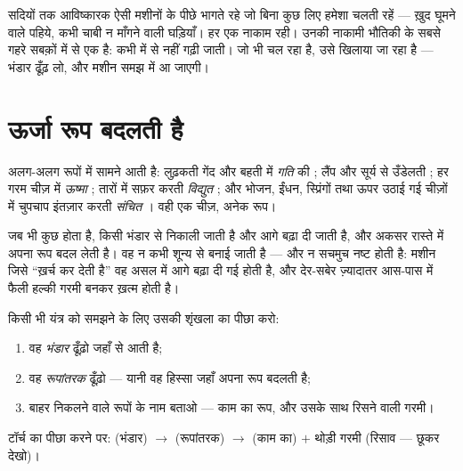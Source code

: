 \begin{remark}[खिलाओ नहीं, तो चलेगा नहीं]\label{rem:g5:everyday-energy:nofree}
सदियों तक आविष्कारक ऐसी मशीनों के पीछे भागते रहे जो बिना कुछ लिए
हमेशा चलती रहें --- ख़ुद घूमने वाले पहिये, कभी चाबी न माँगने वाली
घड़ियाँ। हर एक नाकाम रही। उनकी नाकामी भौतिकी के सबसे गहरे सबक़ों में
से एक है:  कभी  में से नहीं गढ़ी जाती। जो भी चल रहा है, उसे
खिलाया जा रहा है --- भंडार ढूँढ़ लो, और मशीन समझ में आ जाएगी।
\end{remark}

\section{ऊर्जा रूप बदलती है}

\begin{example}[ऊर्जा के रूप]\label{ex:g5:everyday-energy:forms}
 अलग-अलग रूपों में सामने आती है: लुढ़कती गेंद और बहती  में
\emph{गति} की ; लैंप और सूर्य से उँडेलती \emph{} ; हर
गरम चीज़ में \emph{ऊष्मा} ; तारों में सफ़र करती \emph{विद्युत}
; और भोजन, ईंधन, स्प्रिंगों तथा ऊपर उठाई गई चीज़ों में चुपचाप
इंतज़ार करती \emph{संचित} । वही एक चीज़, अनेक रूप।
\end{example}

\begin{proposition}[ऊर्जा की शृंखला]\label{prop:g5:everyday-energy:chain}
जब भी कुछ होता है,  किसी भंडार से निकाली जाती है और आगे बढ़ा दी
जाती है, और अकसर रास्ते में अपना रूप बदल लेती है। वह न कभी शून्य से
बनाई जाती है --- और न सचमुच नष्ट होती है: मशीन जिसे ``ख़र्च कर देती
है'' वह असल में आगे बढ़ा दी गई होती है, और देर-सबेर ज़्यादातर आस-पास
में फैली हल्की गरमी बनकर ख़त्म होती है।
\end{proposition}

\begin{method}[ऊर्जा की शृंखला पढ़ना]\label{met:g5:everyday-energy:read}
किसी भी यंत्र को समझने के लिए उसकी शृंखला का पीछा करो:
\begin{enumerate}
  \item वह \emph{भंडार} ढूँढ़ो जहाँ से  आती है;
  \item वह \emph{रूपांतरक} ढूँढ़ो --- यानी वह हिस्सा जहाँ  अपना
        रूप बदलती है;
  \item बाहर निकलने वाले रूपों के नाम बताओ --- काम का रूप, और उसके
        साथ रिसने वाली गरमी।
\end{enumerate}
टॉर्च का पीछा करने पर:  (भंडार) $\to$  (रूपांतरक) $\to$
 (काम का) $+$ थोड़ी गरमी (रिसाव ---  छूकर देखो)।
\end{method}

